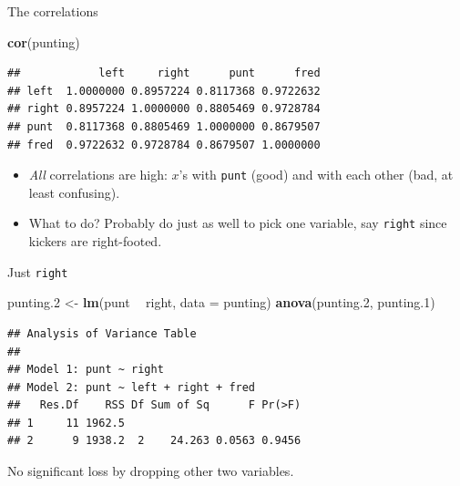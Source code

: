 \documentclass[ignorenonframetext,]{beamer}
\newenvironment{Shaded}{\begin{snugshade}}{\end{snugshade}}
\newcommand{\DataTypeTok}[1]{\textcolor[rgb]{0.13,0.29,0.53}{#1}}
\newcommand{\FloatTok}[1]{\textcolor[rgb]{0.00,0.00,0.81}{#1}}
\newcommand{\KeywordTok}[1]{\textcolor[rgb]{0.13,0.29,0.53}{\textbf{#1}}}
\newcommand{\NormalTok}[1]{#1}
\newcommand{\OperatorTok}[1]{\textcolor[rgb]{0.81,0.36,0.00}{\textbf{#1}}}
\newcommand{\StringTok}[1]{\textcolor[rgb]{0.31,0.60,0.02}{#1}}
\begin{document}
\begin{frame}[fragile]{The correlations}
\protect\hypertarget{the-correlations}{}

\begin{Shaded}
\begin{Highlighting}[]
\KeywordTok{cor}\NormalTok{(punting)}
\end{Highlighting}
\end{Shaded}

\begin{verbatim}
##            left     right      punt      fred
## left  1.0000000 0.8957224 0.8117368 0.9722632
## right 0.8957224 1.0000000 0.8805469 0.9728784
## punt  0.8117368 0.8805469 1.0000000 0.8679507
## fred  0.9722632 0.9728784 0.8679507 1.0000000
\end{verbatim}

\begin{itemize}
\item
  \emph{All} correlations are high: \(x\)'s with \texttt{punt} (good)
  and with each other (bad, at least confusing).
\item
  What to do? Probably do just as well to pick one variable, say
  \texttt{right} since kickers are right-footed.
\end{itemize}

\end{frame}

\begin{frame}[fragile]{Just \texttt{right}}
\protect\hypertarget{just-right}{}

\small

\begin{Shaded}
\begin{Highlighting}[]
\NormalTok{punting}\FloatTok{.2}\NormalTok{ <-}\StringTok{ }\KeywordTok{lm}\NormalTok{(punt }\OperatorTok{~}\StringTok{ }\NormalTok{right, }\DataTypeTok{data =}\NormalTok{ punting)}
\KeywordTok{anova}\NormalTok{(punting}\FloatTok{.2}\NormalTok{, punting}\FloatTok{.1}\NormalTok{)}
\end{Highlighting}
\end{Shaded}

\begin{verbatim}
## Analysis of Variance Table
## 
## Model 1: punt ~ right
## Model 2: punt ~ left + right + fred
##   Res.Df    RSS Df Sum of Sq      F Pr(>F)
## 1     11 1962.5                           
## 2      9 1938.2  2    24.263 0.0563 0.9456
\end{verbatim}

\normalsize

No significant loss by dropping other two variables.

\end{frame}
\end{document}
